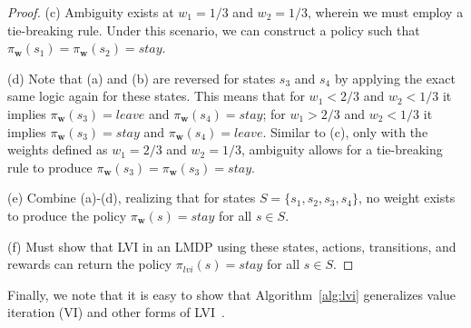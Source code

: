 \begin{proof}
(c) Ambiguity exists at $w_1 = 1/3$ and $w_2 = 1/3$, wherein we must employ a tie-breaking rule. Under this scenario, we can construct a policy such that $\pi_\mathbf{w}(s_1) = \pi_\mathbf{w}(s_2) = stay$.

(d) Note that (a) and (b) are reversed for states $s_3$ and $s_4$ by applying the exact same logic again for these states. This means that for $w_1 < 2/3$ and $w_2 < 1/3$ it implies $\pi_\mathbf{w}(s_3) = leave$ and $\pi_\mathbf{w}(s_4) = stay$; for $w_1 > 2/3$ and $w_2 < 1/3$ it implies $\pi_\mathbf{w}(s_3) = stay$ and $\pi_\mathbf{w}(s_4) = leave$. Similar to (c), only with the weights defined as $w_1 = 2/3$ and $w_2 = 1/3$, ambiguity allows for a tie-breaking rule to produce $\pi_\mathbf{w}(s_3) = \pi_\mathbf{w}(s_3) = stay$.

(e) Combine (a)-(d), realizing that for states $S = \{s_1, s_2, s_3, s_4\}$, no weight exists to produce the policy $\pi_\mathbf{w}(s) = stay$ for all $s \in S$.

(f) Must show that LVI in an LMDP using these states, actions, transitions, and rewards can return the policy $\pi_{lvi}(s) = stay$ for all $s \in S$.

\end{proof}

Finally, we note that it is easy to show that Algorithm~\ref{alg:lvi} generalizes value iteration (VI) and other forms of LVI~\cite{Gabor98-MultiObjectiveReinforcementLearning}.

